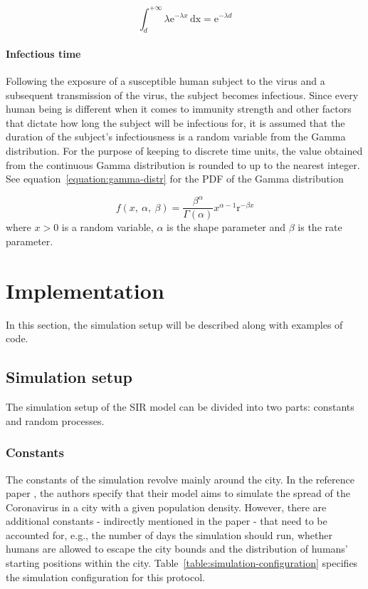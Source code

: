 \documentclass[a4paper]{article}
\begin{document}
\begin{equation}
	\int_{d}^{+\infty} \lambda \mathrm{e}^{-\lambda x} \,\mathrm{dx} = \mathrm{e}^{-\lambda d}
	\label{equation:exp-pdf-integral}
\end{equation}

\paragraph{Infectious time}
Following the exposure of a susceptible human subject to the virus and a subsequent transmission of the virus, the subject becomes infectious. Since every human being is different when it comes to immunity strength and other factors that dictate how long the subject will be infectious for, it is assumed that the duration of the subject's infectiousness is a random variable from the Gamma distribution. For the purpose of keeping to discrete time units, the value obtained from the continuous Gamma distribution is rounded to up to the nearest integer. See equation~\eqref{equation:gamma-distr} for the PDF of the Gamma distribution

\begin{equation}
	f(x,\:\alpha,\:\beta) = \frac{\beta^\alpha}{\Gamma \left(\alpha\right)} x^{\alpha-1} \mathrm{r}^{-\beta x}
	\label{equation:gamma-distr}
\end{equation}
\noindent
where $x > 0$ is a random variable, $\alpha$ is the shape parameter and $\beta$ is the rate parameter.




\section{Implementation}\label{section:implementation}
In this section, the simulation setup will be described along with examples of code.

\subsection{Simulation setup}
The simulation setup of the SIR model can be divided into two parts: constants and random processes.

\subsubsection{Constants}
The constants of the simulation revolve mainly around the city. In the reference paper \cite{Maltezos2021}, the authors specify that their model aims to simulate the spread of the Coronavirus in a city with a given population density. However, there are additional constants - indirectly mentioned in the paper - that need to be accounted for, e.g., the number of days the simulation should run, whether humans are allowed to escape the city bounds and the distribution of humans' starting positions within the city. Table~\ref{table:simulation-configuration} specifies the simulation configuration for this protocol.
\end{document}
